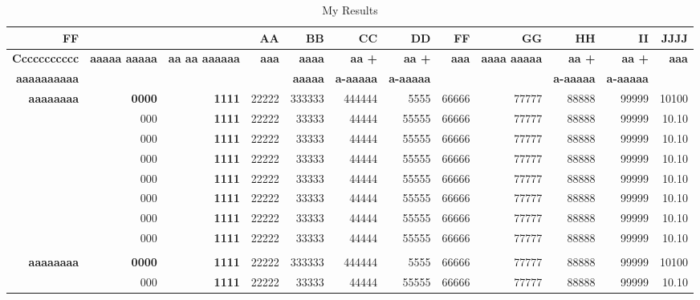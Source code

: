 \documentclass[9pt,article,twoside]{fapet-rho-class/fapet-rho}
\begin{document}
\begin{landscape}
\begin{table}[htbp]
  \centering\small
  \caption{My Results \label{tab:pwlstable}}
    \begin{tabular}{rrrrrrrrrrrr}
    \toprule
    \textbf{FF} & \textbf{} & \textbf{} & \textbf{AA} & \textbf{BB} & \textbf{CC} & \textbf{DD} & \textbf{FF} & \textbf{GG} & \textbf{HH} & \textbf{II} & \textbf{JJJJ} \\
    \midrule
    \textbf{Ccccccccccc} & \multirow{2}[2]{*}{\textbf{aaaaa aaaaa}} & \multirow{2}[2]{*}{\textbf{aa aa aaaaaa}} & \multirow{2}[2]{*}{\textbf{aaa}} & \textbf{aaaa} & \textbf{aa +} & \textbf{aa +} & \multirow{2}[2]{*}{\textbf{aaa}} & \multirow{2}[2]{*}{\textbf{aaaa aaaaa}} & \textbf{aa +} & \textbf{aa +} & \multirow{2}[2]{*}{\textbf{aaa}} \\
    \textbf{aaaaaaaaaa} &       &       &       & \textbf{aaaaa} & \textbf{a-aaaaa} & \textbf{a-aaaaa} &       &       & \textbf{a-aaaaa} & \textbf{a-aaaaa} &  \\
    \midrule
    \textbf{aaaaaaaa} & \textbf{0000} & \textbf{1111} & 22222 & 333333 & 444444 & 5555  & 66666 & 77777 & 88888 & 99999 & 10100 \\
          & 000   & \textbf{1111} & 22222 & 33333 & 44444 & 55555  & 66666 & 77777 & 88888 & 99999 & 10.10 \\
          & 000   & \textbf{1111} & 22222 & 33333 & 44444 & 55555  & 66666 & 77777 & 88888 & 99999 & 10.10 \\
          & 000   & \textbf{1111} & 22222 & 33333 & 44444 & 55555  & 66666 & 77777 & 88888 & 99999 & 10.10 \\
          & 000   & \textbf{1111} & 22222 & 33333 & 44444 & 55555  & 66666 & 77777 & 88888 & 99999 & 10.10 \\
          & 000   & \textbf{1111} & 22222 & 33333 & 44444 & 55555  & 66666 & 77777 & 88888 & 99999 & 10.10 \\
          & 000   & \textbf{1111} & 22222 & 33333 & 44444 & 55555  & 66666 & 77777 & 88888 & 99999 & 10.10 \\
          & 000   & \textbf{1111} & 22222 & 33333 & 44444 & 55555  & 66666 & 77777 & 88888 & 99999 & 10.10 \\\\
    \textbf{aaaaaaaa} & \textbf{0000} & \textbf{1111} & 22222 & 333333 & 444444 & 5555  & 66666 & 77777 & 88888 & 99999 & 10100 \\
          & 000   & \textbf{1111} & 22222 & 33333 & 44444 & 55555  & 66666 & 77777 & 88888 & 99999 & 10.10 \\

\end{tabular}
\end{table}
\end{landscape}
\end{document}
